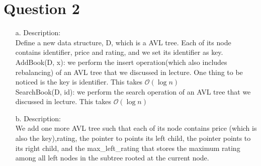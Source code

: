 \documentclass[10pt]{article}
\begin{document}
\section*{Question 2}
\begin{enumerate}
\item[a.]Description:\\
Define a new data structure, D, which is a AVL tree. Each of its node contains identifier, price and rating, and we set its identifier as key.\\
AddBook(D, x): we perform the insert operation(which also includes rebalancing) of an AVL tree that we discussed in lecture. One thing to be noticed is the key is identifier. This takes $\mathcal{O}(\log{}n)$\\
SearchBook(D, id): we perform the search operation of an AVL tree that we discussed in lecture. This takes $\mathcal{O}(\log{}n)$\\
\item[b.]
Description:\\
We add one more AVL tree such that each of its node contains price (which is also the key),rating, the pointer to points its left child, the pointer points to its right child, and the max\_left\_rating that stores the maximum rating among all left nodes in the subtree rooted at the current node.\\


\end{enumerate}
\end{document}
